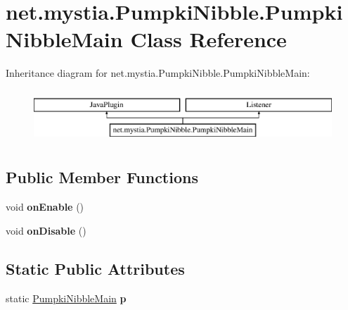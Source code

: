 \hypertarget{classnet_1_1mystia_1_1_pumpki_nibble_1_1_pumpki_nibble_main}{\section{net.\-mystia.\-Pumpki\-Nibble.\-Pumpki\-Nibble\-Main Class Reference}
\label{classnet_1_1mystia_1_1_pumpki_nibble_1_1_pumpki_nibble_main}
}
Inheritance diagram for net.\-mystia.\-Pumpki\-Nibble.\-Pumpki\-Nibble\-Main\-:\begin{figure}[H]
\begin{center}
\leavevmode
\includegraphics[height=2.000000cm]{classnet_1_1mystia_1_1_pumpki_nibble_1_1_pumpki_nibble_main}
\end{center}
\end{figure}
\subsection*{Public Member Functions}
\begin{DoxyCompactItemize}
\item 
\hypertarget{classnet_1_1mystia_1_1_pumpki_nibble_1_1_pumpki_nibble_main_a017f6f9ee132aa845d6f9835164b2be2}{void {\bfseries on\-Enable} ()}\label{classnet_1_1mystia_1_1_pumpki_nibble_1_1_pumpki_nibble_main_a017f6f9ee132aa845d6f9835164b2be2}

\item 
\hypertarget{classnet_1_1mystia_1_1_pumpki_nibble_1_1_pumpki_nibble_main_a7cb691f8f50867a245155243ad6aaf01}{void {\bfseries on\-Disable} ()}\label{classnet_1_1mystia_1_1_pumpki_nibble_1_1_pumpki_nibble_main_a7cb691f8f50867a245155243ad6aaf01}

\end{DoxyCompactItemize}
\subsection*{Static Public Attributes}
\begin{DoxyCompactItemize}
\item 
\hypertarget{classnet_1_1mystia_1_1_pumpki_nibble_1_1_pumpki_nibble_main_a7c44f28895a886f1155310b2e2839bc4}{static \hyperlink{classnet_1_1mystia_1_1_pumpki_nibble_1_1_pumpki_nibble_main}{Pumpki\-Nibble\-Main} {\bfseries p}}\label{classnet_1_1mystia_1_1_pumpki_nibble_1_1_pumpki_nibble_main_a7c44f28895a886f1155310b2e2839bc4}

\end{DoxyCompactItemize}


